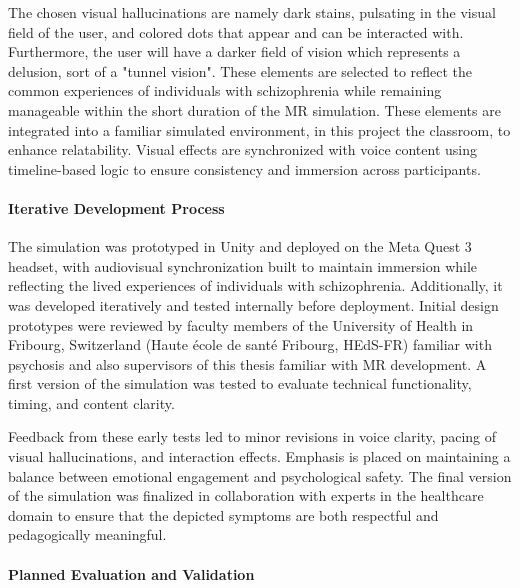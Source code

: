 \vspace{1em}

The chosen visual hallucinations are namely dark stains, pulsating in the visual field of the user, and colored dots that appear and can be interacted with. Furthermore, the user will have a darker field of vision which represents a delusion, sort of a "tunnel vision". These elements are selected to reflect the common experiences of individuals with schizophrenia while remaining manageable within the short duration of the MR simulation.  These elements are integrated into a familiar simulated environment, in this project the classroom, to enhance relatability. Visual effects are synchronized with voice content using timeline-based logic to ensure consistency and immersion across participants.

\paragraph{Iterative Development Process}

The simulation was prototyped in Unity and deployed on the Meta Quest 3 headset, with audiovisual synchronization built to maintain immersion while reflecting the lived experiences of individuals with schizophrenia. Additionally, it was developed iteratively and tested internally before deployment. Initial design prototypes were reviewed by faculty members of the University of Health in Fribourg, Switzerland (Haute école de santé Fribourg, HEdS-FR) familiar with psychosis and also supervisors of this thesis familiar with MR development. A first version of the simulation was tested to evaluate technical functionality, timing, and content clarity.

\vspace{1em}

Feedback from these early tests led to minor revisions in voice clarity, pacing of visual hallucinations, and interaction effects. Emphasis is placed on maintaining a balance between emotional engagement and psychological safety. The final version of the simulation was finalized in collaboration with experts in the healthcare domain to ensure that the depicted symptoms are both respectful and pedagogically meaningful.

\paragraph{Planned Evaluation and Validation}


